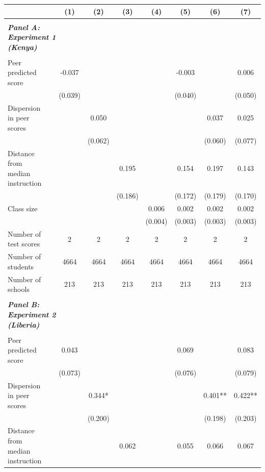 \begin{center} 
\caption{\small Effect on absolute deviation in test scores from class mean} 
\label{tab:descriptives} 
\begin{scriptsize}
\begin{threeparttable}
\begin{tabular} {@{} l l c c c c c c c  @{}} \toprule \toprule
& &(1)&(2)&(3)&(4)&(5)&(6)&(7) \\ \midrule 
\\
\multicolumn{3}{l}{\textbf{\textit{Panel A: Experiment 1 (Kenya)}}} \\
\\
Peer predicted score &  & -0.037 &  &  &  & -0.003 &  & 0.006 \\
                 &  & (0.039) &  &  &  & (0.040) &  & (0.050) \\
Dispersion in peer scores &  &  & 0.050 &  &  &  & 0.037 & 0.025 \\
                 &  &  & (0.062) &  &  &  & (0.060) & (0.077) \\
Distance from median instruction &  &  &  & 0.195 &  & 0.154 & 0.197 & 0.143 \\
                 &  &  &  & (0.186) &  & (0.172) & (0.179) & (0.170) \\
Class size &  &  &  &  & 0.006 & 0.002 & 0.002 & 0.002 \\
                 &  &  &  &  & (0.004) & (0.003) & (0.003) & (0.003) \\
\midrule
Number of test scores &  & 2 & 2 & 2 & 2 & 2 & 2 & 2 \\
Number of students &  & 4664 & 4664 & 4664 & 4664 & 4664 & 4664 & 4664 \\
Number of schools &  & 213 & 213 & 213 & 213 & 213 & 213 & 213 \\
 \midrule
\\
\multicolumn{3}{l}{\textbf{\textit{Panel B: Experiment 2 (Liberia)}}} \\
\\
Peer predicted score &  & 0.043 &  &  &  & 0.069 &  & 0.083 \\
                 &  & (0.073) &  &  &  & (0.076) &  & (0.079) \\
Dispersion in peer scores &  &  & 0.344* &  &  &  & 0.401** & 0.422** \\
                 &  &  & (0.200) &  &  &  & (0.198) & (0.203) \\
Distance from median instruction &  &  &  & 0.062 &  & 0.055 & 0.066 & 0.067 \\

\end{tabular}
\end{threeparttable}
\end{scriptsize}
\end{center}
